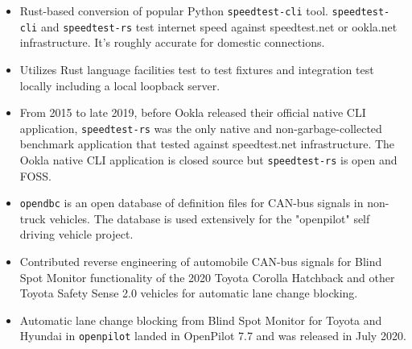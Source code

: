 \documentclass[10pt,letter,ragged2e]{altacv}
\begin{document}
\begin{paracol}{2}

\begin{itemize}
\item Rust-based conversion of popular Python \texttt{speedtest-cli} tool. \texttt{speedtest-cli} and \texttt{speedtest-rs} test internet speed against speedtest.net or ookla.net infrastructure. It's roughly accurate for domestic connections.
\item Utilizes Rust language facilities test to test fixtures and integration test locally including a local loopback server.
\item From 2015 to late 2019, before Ookla released their official native CLI application, \texttt{speedtest-rs} was the only native and non-garbage-collected benchmark application that tested against speedtest.net infrastructure. The Ookla native CLI application is closed source but \texttt{speedtest-rs} is open and FOSS.
\end{itemize}

\divider


\begin{itemize}
\item \texttt{opendbc} is an open database of definition files for CAN-bus signals in non-truck vehicles. The database is used extensively for the "openpilot" self driving vehicle project.
\item Contributed reverse engineering of automobile CAN-bus signals for Blind Spot Monitor functionality of the 2020 Toyota Corolla Hatchback and other Toyota Safety Sense 2.0 vehicles for automatic lane change blocking.
\item Automatic lane change blocking from Blind Spot Monitor for Toyota and Hyundai in \texttt{openpilot} landed in OpenPilot 7.7 and was released in July 2020.
\end{itemize}



\divider



\end{paracol}
\end{document}
